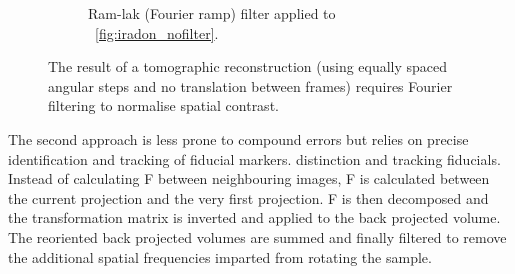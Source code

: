 \begin{figure}
\begin{subfigure}[t]{0.3\textwidth}
    \caption[Filtered iRadon]{Ram-lak (Fourier ramp) filter applied to \figurename~\ref{fig:iradon_nofilter}.}
    \label{fig:iradon_filter}
  \end{subfigure}
     \hspace*{\fill}
  \caption{The result of a tomographic reconstruction (using equally spaced angular steps and no translation between frames) requires Fourier filtering to normalise spatial contrast.}\label{fig:irandons}%
\end{figure}

The second approach is less prone to compound errors but relies on precise identification and tracking of fiducial markers.
distinction and tracking fiducials.
Instead of calculating \gls{F} between neighbouring images, \gls{F} is calculated between the current projection and the very first projection.
\gls{F} is then decomposed and the transformation matrix is inverted and applied to the back projected volume.
The reoriented back projected volumes are summed and finally filtered to remove the additional spatial frequencies imparted from rotating the sample.


% 
%


